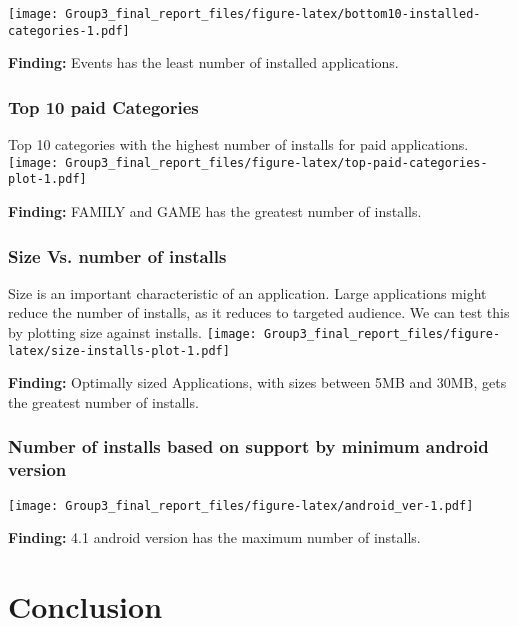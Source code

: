 \documentclass[
]{article}
\begin{document}
\texttt{[image: Group3\_final\_report\_files/figure-latex/bottom10-installed-categories-1.pdf]}

\textbf{Finding:} Events has the least number of installed applications.

\hypertarget{top-10-paid-categories}{%
\subsubsection{Top 10 paid Categories}\label{top-10-paid-categories}}

Top 10 categories with the highest number of installs for paid
applications.\\
\texttt{[image: Group3\_final\_report\_files/figure-latex/top-paid-categories-plot-1.pdf]}

\textbf{Finding:} FAMILY and GAME has the greatest number of installs.

\hypertarget{size-vs.-number-of-installs}{%
\subsubsection{Size Vs. number of
installs}\label{size-vs.-number-of-installs}}

Size is an important characteristic of an application. Large
applications might reduce the number of installs, as it reduces to
targeted audience. We can test this by plotting size against installs.
\texttt{[image: Group3\_final\_report\_files/figure-latex/size-installs-plot-1.pdf]}

\textbf{Finding:} Optimally sized Applications, with sizes between 5MB
and 30MB, gets the greatest number of installs.

\hypertarget{number-of-installs-based-on-support-by-minimum-android-version}{%
\subsubsection{Number of installs based on support by minimum android
version}\label{number-of-installs-based-on-support-by-minimum-android-version}}

\texttt{[image: Group3\_final\_report\_files/figure-latex/android\_ver-1.pdf]}

\textbf{Finding:} 4.1 android version has the maximum number of
installs.

\hypertarget{conclusion}{%
\section{Conclusion}\label{conclusion}}
\end{document}
